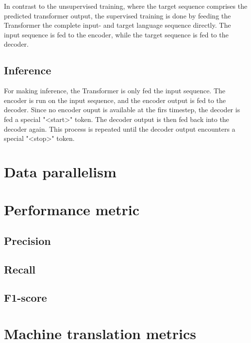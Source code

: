 In contrast to the unsupervised training, where the target sequence comprises the predicted transformer output, the supervised training is done by feeding the Transformer the complete input- and target language sequence directly. The input sequence is fed to the encoder, while the target sequence is fed to the decoder.

\subsection{Inference}
\label{sec:transformer-inference}
For making inference, the Transformer is only fed the input sequence. The encoder is run on the input sequence, and the encoder output is fed to the decoder. Since no encoder ouput is available at the firs timestep, the decoder is fed a special "<start>" token. The decoder output is then fed back into the decoder again. This process is repeated until the decoder output encounters a special "<stop>" token.


\section{Data parallelism}
\label{sec:data-parallelism}

\section{Performance metric}
\label{sec:performance-metric}

\subsection{Precision}
\label{sec:precision}

\subsection{Recall}
\label{sec:recall}

\subsection{F1-score}
\label{sec:f1-score}

\section{Machine translation metrics}
\label{sec:machine-translation-metrics}

